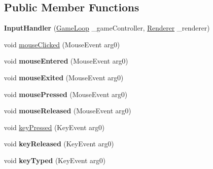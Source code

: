 \subsection*{Public Member Functions}
\begin{DoxyCompactItemize}
\item 
\hypertarget{classcontroller_1_1_input_handler_a892a6081e0cdfcff43180dd3672ef97d}{{\bfseries Input\-Handler} (\hyperlink{classcontroller_1_1_game_loop}{Game\-Loop} \-\_\-game\-Controller, \hyperlink{classview_1_1_renderer}{Renderer} \-\_\-renderer)}\label{classcontroller_1_1_input_handler_a892a6081e0cdfcff43180dd3672ef97d}

\item 
void \hyperlink{classcontroller_1_1_input_handler_a08a9fb76e8c566a168bef8928215c69f}{mouse\-Clicked} (Mouse\-Event arg0)
\item 
\hypertarget{classcontroller_1_1_input_handler_a7f20d015bcca1f8956a48ffca7030204}{void {\bfseries mouse\-Entered} (Mouse\-Event arg0)}\label{classcontroller_1_1_input_handler_a7f20d015bcca1f8956a48ffca7030204}

\item 
\hypertarget{classcontroller_1_1_input_handler_a1afce6568d23b216b51bb660269fbf5b}{void {\bfseries mouse\-Exited} (Mouse\-Event arg0)}\label{classcontroller_1_1_input_handler_a1afce6568d23b216b51bb660269fbf5b}

\item 
\hypertarget{classcontroller_1_1_input_handler_a2f7e2f2634d4c97160800ea684e576d4}{void {\bfseries mouse\-Pressed} (Mouse\-Event arg0)}\label{classcontroller_1_1_input_handler_a2f7e2f2634d4c97160800ea684e576d4}

\item 
\hypertarget{classcontroller_1_1_input_handler_ac32298c58aec32dbdc3aae5a8f5f2ce4}{void {\bfseries mouse\-Released} (Mouse\-Event arg0)}\label{classcontroller_1_1_input_handler_ac32298c58aec32dbdc3aae5a8f5f2ce4}

\item 
void \hyperlink{classcontroller_1_1_input_handler_a744fe9a4f640629b33dca848a74e2eba}{key\-Pressed} (Key\-Event arg0)
\item 
\hypertarget{classcontroller_1_1_input_handler_aae66aefba8d5584b304fda662b508d5b}{void {\bfseries key\-Released} (Key\-Event arg0)}\label{classcontroller_1_1_input_handler_aae66aefba8d5584b304fda662b508d5b}

\item 
\hypertarget{classcontroller_1_1_input_handler_a285eb3a7aaa14fb9946321db3507dcdd}{void {\bfseries key\-Typed} (Key\-Event arg0)}\label{classcontroller_1_1_input_handler_a285eb3a7aaa14fb9946321db3507dcdd}

\end{DoxyCompactItemize}


